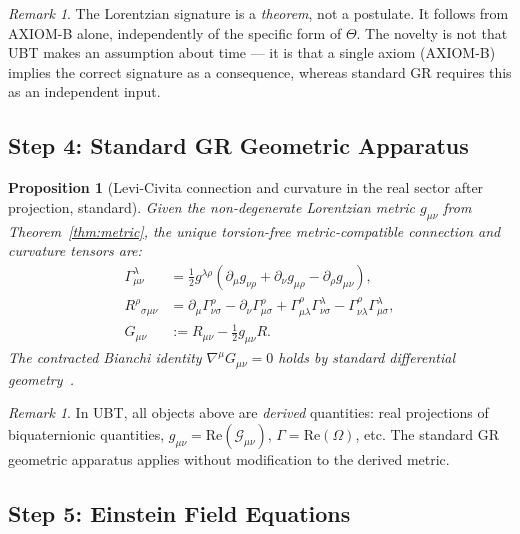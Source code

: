 \documentclass[12pt,a4paper]{article}
\newtheorem{proposition}[theorem]{Proposition}
\theoremstyle{definition}
\theoremstyle{remark}
\newtheorem{remark}[theorem]{Remark}
\newcommand{\re}{\mathrm{Re}}
\newcommand{\calG}{\mathcal{G}}
\begin{document}
\begin{remark}
The Lorentzian signature is a \emph{theorem}, not a postulate.
It follows from AXIOM-B alone, independently of the specific form of $\Theta$.
The novelty is not that UBT makes an assumption about time — it is that a single
axiom (AXIOM-B) implies the correct signature as a consequence, whereas standard
GR requires this as an independent input.
\end{remark}

\subsection{Step 4: Standard GR Geometric Apparatus}
\label{sec:step4}

\begin{proposition}[Levi-Civita connection and curvature in the real sector after projection, standard]
\label{prop:geometry}
Given the non-degenerate Lorentzian metric $g_{\mu\nu}$ from
Theorem~\ref{thm:metric}, the unique torsion-free metric-compatible connection
and curvature tensors are:
\begin{align}
  \Gamma^\lambda_{\mu\nu}
    &= \tfrac{1}{2}g^{\lambda\rho}
       (\partial_\mu g_{\nu\rho} + \partial_\nu g_{\mu\rho}
        - \partial_\rho g_{\mu\nu}), \\
  R^\rho{}_{\sigma\mu\nu}
    &= \partial_\mu\Gamma^\rho_{\nu\sigma}
       - \partial_\nu\Gamma^\rho_{\mu\sigma}
       + \Gamma^\rho_{\mu\lambda}\Gamma^\lambda_{\nu\sigma}
       - \Gamma^\rho_{\nu\lambda}\Gamma^\lambda_{\mu\sigma}, \\
  G_{\mu\nu}
    &:= R_{\mu\nu} - \tfrac{1}{2}g_{\mu\nu}R.
\end{align}
The contracted Bianchi identity $\nabla^\mu G_{\mu\nu} = 0$ holds by standard
differential geometry~\cite{wald1984,mtw1973}.
\end{proposition}

\begin{remark}
In UBT, all objects above are \emph{derived} quantities: real projections of
biquaternionic quantities,
$g_{\mu\nu} = \re(\calG_{\mu\nu})$,
$\Gamma = \re(\Omega)$, etc.
The standard GR geometric apparatus applies without modification to the
derived metric.
\end{remark}

\subsection{Step 5: Einstein Field Equations}
\label{sec:step5}
\end{document}
